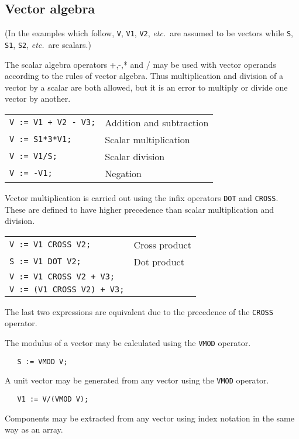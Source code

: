 \subsection{Vector algebra}

(In the examples which follow, {\tt V}, {\tt V1}, {\tt V2}, {\em etc.}\
are assumed to be vectors while {\tt S}, {\tt S1}, {\tt S2}, {\em etc.}\ are scalars.)

The scalar algebra operators +,-,* and / may be used with
vector operands according to the rules of vector algebra.
Thus multiplication and division of a vector by a scalar
are both allowed, but it is an error to multiply or
divide one vector by another.

\begin{tabular}{l l}
{\tt V := V1 + V2 - V3;} & Addition and subtraction \\
{\tt V := S1*3*V1;} & Scalar multiplication \\
{\tt V := V1/S;} & Scalar division \\
{\tt V := -V1;} & Negation \\
\end{tabular}

  
\index{Cross product}
\noindent Vector multiplication is carried out using the infix
operators {\tt DOT} and {\tt CROSS}. These are defined to have
higher precedence than scalar multiplication and
division.

\begin{tabular}{l l}
{\tt V := V1 CROSS V2;} & Cross product \\
{\tt S := V1 DOT V2;} & Dot product \\
{\tt V := V1 CROSS V2 + V3;} & \\
{\tt V := (V1 CROSS V2) + V3;} & \\
\end{tabular}

The last two expressions are equivalent due to the precedence of
the {\tt CROSS} operator.

The modulus of a vector may be calculated using the {\tt VMOD} operator.
\begin{verbatim}
   S := VMOD V;
\end{verbatim}
A unit vector may be generated from any vector using the {\tt VMOD}
operator.
\begin{verbatim}
   V1 := V/(VMOD V);
\end{verbatim}
Components may be extracted from any vector using index notation
in the same way as an array.

